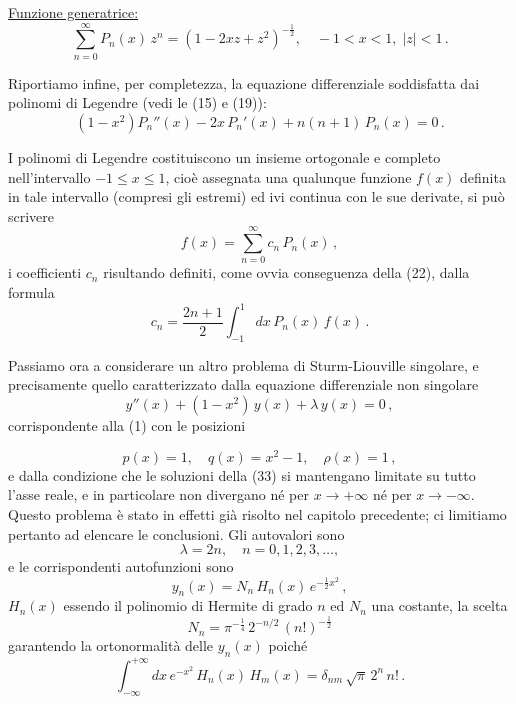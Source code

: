 \documentclass[11pt, a4paper]{book}
\numberwithin{equation}{section}
\begin{document}
\medskip
\noindent\underline{Funzione generatrice:}
\begin{equation}
\sum_{n=0}^{\infty} P_n(x)\, z^n = \left(1 - 2xz + z^2\right)^{-\frac{1}{2}}, \quad -1 < x < 1,\; |z| < 1 \,. \tag{29}
\end{equation}

Riportiamo infine, per completezza, la equazione differenziale soddisfatta dai polinomi di Legendre (vedi le (15) e (19)):
\begin{equation}
(1-x^2) P_n''(x) - 2x\, P_n'(x) + n(n+1)\, P_n(x) = 0 \,. \tag{30}
\end{equation}

I polinomi di Legendre costituiscono un insieme ortogonale e
completo nell'intervallo $-1 \leq x \leq 1$, cioè assegnata una qualunque
funzione $f(x)$ definita in tale intervallo (compresi gli estremi) ed ivi continua con le sue derivate, si può scrivere
\begin{equation}
f(x) = \sum_{n=0}^{\infty} c_n\, P_n(x) \,, \tag{31}
\end{equation}
i coefficienti $c_n$ risultando definiti, come ovvia conseguenza della (22),
dalla formula
\begin{equation}
c_n = \frac{2n+1}{2} \int_{-1}^{1} dx\, P_n(x)\, f(x) \,. \tag{32}
\end{equation}

Passiamo ora a considerare un altro problema di Sturm-Liouville
singolare, e precisamente quello caratterizzato dalla equazione differenziale non singolare
\begin{equation}
y''(x) + (1-x^2)\, y(x) + \lambda\, y(x) = 0 \,, \tag{33}
\end{equation}
corrispondente alla (1) con le posizioni


\begin{equation}
p(x) = 1, \quad q(x) = x^2 - 1, \quad \rho(x) = 1 \,, \tag{34}
\end{equation}
e dalla condizione che le soluzioni della (33) si mantengano limitate
su tutto l'asse reale, e in particolare non divergano né per $x \to +\infty$
né per $x \to -\infty$. Questo problema è stato in effetti già risolto
nel capitolo precedente; ci limitiamo pertanto ad elencare le conclusioni. Gli autovalori sono
\begin{equation}
\lambda = 2n, \quad n = 0, 1, 2, 3, \ldots, \tag{35}
\end{equation}
e le corrispondenti autofunzioni sono
\begin{equation}
y_n(x) = N_n\, H_n(x)\, e^{-\frac{1}{2}x^2} \,, \tag{36}
\end{equation}
$H_n(x)$ essendo il polinomio di Hermite di grado $n$ ed $N_n$ una
costante, la scelta
\begin{equation}
N_n = \pi^{-\frac{1}{4}}\, 2^{-n/2}\, (n!)^{-\frac{1}{2}} \tag{37}
\end{equation}
garantendo la ortonormalità delle $y_n(x)$ poiché
\begin{equation}
\int_{-\infty}^{+\infty} dx\, e^{-x^2}\, H_n(x)\, H_m(x) = \delta_{nm}\, \sqrt{\pi}\, 2^n\, n! \,. \tag{38}
\end{equation}
\end{document}
